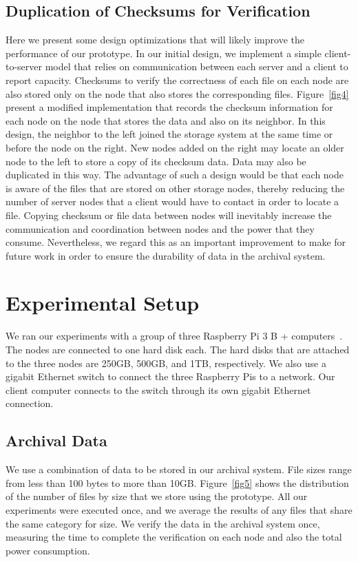 \subsection{Duplication of Checksums for Verification}
Here we present some design optimizations that will likely improve the performance of our prototype.  In our initial design, we implement a simple client-to-server model that relies on communication between each server and a client to report capacity.  Checksums to verify the correctness of each file on each node are also stored only on the node that also stores the corresponding files.  Figure~\ref{fig4} present a modified implementation that records the checksum information for each node on the node that stores the data and also on its neighbor.  In this design, the neighbor to the left joined the storage system at the same time or before the node on the right.  New nodes added on the right may locate an older node to the left to store a copy of its checksum data.  Data may also be duplicated in this way.  The advantage of such a design would be that each node is aware of the files that are stored on other storage nodes, thereby reducing the number of server nodes that a client would have to contact in order to locate a file.  Copying checksum or file data between nodes will inevitably increase the communication and coordination between nodes and the power that they consume.  Nevertheless, we regard this as an important improvement to make for future work in order to ensure the durability of data in the archival system.

\section{Experimental Setup}
We ran our experiments with a group of three Raspberry Pi 3 B + computers~\cite{web49}.  The nodes are connected to one hard disk each.  The hard disks that are attached to the three nodes are 250GB, 500GB, and 1TB, respectively.  We also use a gigabit Ethernet switch to connect the three Raspberry Pis to a network.  Our client computer connects to the switch through its own gigabit Ethernet connection.

\subsection{Archival Data}
We use a combination of data to be stored in our archival system.  File sizes range from less than 100 bytes to more than 10GB.  Figure~\ref{fig5} shows the distribution of the number of files by size that we store using the prototype.  All our experiments were executed once, and we average the results of any files that share the same category for size.  We verify the data in the archival system once, measuring the time to complete the verification on each node and also the total power consumption.

